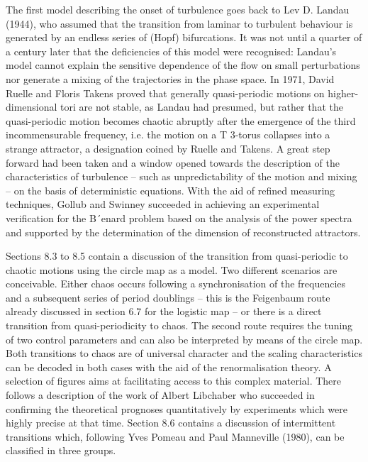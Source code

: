 \documentclass[12pt]{article}
\begin{document}
The first model describing the onset of turbulence goes back to Lev D. Landau
(1944), who assumed that the transition from laminar to turbulent behaviour is
generated by an endless series of (Hopf) bifurcations. It was not until a quarter of
a century later that the deficiencies of this model were recognised: Landau’s model
cannot explain the sensitive dependence of the flow on small perturbations nor generate
a mixing of the trajectories in the phase space. In 1971, David Ruelle and
Floris Takens proved that generally quasi-periodic motions on higher-dimensional
tori are not stable, as Landau had presumed, but rather that the quasi-periodic
motion becomes chaotic abruptly after the emergence of the third incommensurable
frequency, i.e. the motion on a T 3-torus collapses into a strange attractor,
a designation coined by Ruelle and Takens. A great step forward had been taken
and a window opened towards the description of the characteristics of turbulence
– such as unpredictability of the motion and mixing – on the basis of deterministic
equations. With the aid of refined measuring techniques, Gollub and Swinney
succeeded in achieving an experimental verification for the B´enard problem based
on the analysis of the power spectra and supported by the determination of the
dimension of reconstructed attractors.

\hfill

Sections 8.3 to 8.5 contain a discussion of the transition from quasi-periodic to
chaotic motions using the circle map as a model. Two different scenarios are conceivable.
Either chaos occurs following a synchronisation of the frequencies and a
subsequent series of period doublings – this is the Feigenbaum route already discussed
in section 6.7 for the logistic map – or there is a direct transition from
quasi-periodicity to chaos. The second route requires the tuning of two control parameters
and can also be interpreted by means of the circle map. Both transitions
to chaos are of universal character and the scaling characteristics can be decoded
in both cases with the aid of the renormalisation theory. A selection of figures aims
at facilitating access to this complex material. There follows a description of the
work of Albert Libchaber who succeeded in confirming the theoretical prognoses
quantitatively by experiments which were highly precise at that time. Section 8.6
contains a discussion of intermittent transitions which, following Yves Pomeau and
Paul Manneville (1980), can be classified in three groups.

\hfill
\end{document}

